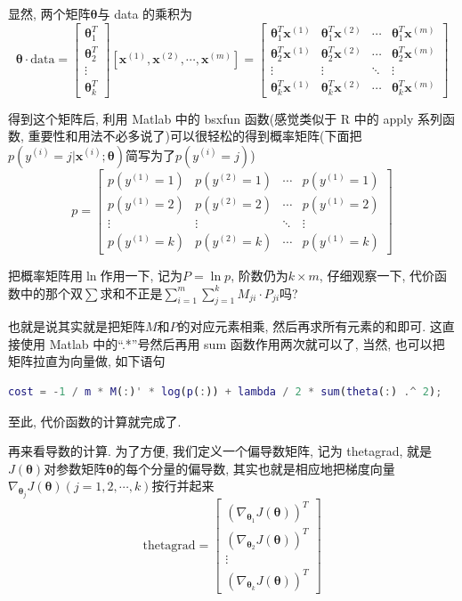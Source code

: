 \documentclass[a4paper,UTF8]{ctexart}
\theoremstyle{plain} \newtheorem{theorem}{定理}[section]
\theoremstyle{plain} \newtheorem{definition}{定义}[section]
\theoremstyle{plain} \newtheorem{lemma}{引理}[section]
\theoremstyle{plain} \newtheorem{proposition}{命题}[section]
\theoremstyle{plain} \newtheorem{example}{例}[section]
\theoremstyle{plain} \newtheorem{remark}{注}[section]
\theoremstyle{plain} \newtheorem{corollary}{推论}[section]
\begin{document}
显然, 两个矩阵$\bm{\theta}$与 data 的乘积为
$$
\bm{\theta} \cdot \mathrm{data} = 
\begin{bmatrix}
\bm{\theta}_{1}^{T} \\ 
\bm{\theta}_{2}^{T} \\ 
\vdots \\ 
\bm{\theta}_{k}^{T}
\end{bmatrix}
[\bm{x}^{(1)}, \bm{x}^{(2)}, \cdots, \bm{x}^{(m)}] = 
\begin{bmatrix}
\bm{\theta}_{1}^{T} \bm{x}^{(1)} & \bm{\theta}_{1}^{T} \bm{x}^{(2)} & \cdots & \bm{\theta}_{1}^{T} \bm{x}^{(m)} \\ 
\bm{\theta}_{2}^{T} \bm{x}^{(1)} & \bm{\theta}_{2}^{T} \bm{x}^{(2)} & \cdots & \bm{\theta}_{2}^{T} \bm{x}^{(m)} \\ 
\vdots & \vdots & \ddots & \vdots \\ 
\bm{\theta}_{k}^{T} \bm{x}^{(1)} & \bm{\theta}_{k}^{T} \bm{x}^{(2)} & \cdots & \bm{\theta}_{k}^{T} \bm{x}^{(m)}
\end{bmatrix}
$$

得到这个矩阵后, 利用 Matlab 中的 bsxfun 函数(感觉类似于 R 中的 apply 系列函数, 重要性和用法不必多说了)可以很轻松的得到概率矩阵(下面把$p(y^{(i)} = j | \bm{x}^{(i)}; \bm{\theta})$简写为了$p(y^{(i)} = j)$)
$$
p = 
\begin{bmatrix}
p(y^{(1)} = 1) & p(y^{(2)} = 1) & \cdots & p(y^{(1)} = 1) \\ 
p(y^{(1)} = 2) & p(y^{(2)} = 2) & \cdots & p(y^{(1)} = 2) \\
\vdots & \vdots & \ddots & \vdots \\ 
p(y^{(1)} = k) & p(y^{(2)} = k) & \cdots & p(y^{(1)} = k)
\end{bmatrix}
$$

把概率矩阵用$\ln$作用一下, 记为$P = \ln p$, 阶数仍为$k \times m$, 仔细观察一下, 代价函数中的那个双$\sum$求和不正是$\sum\limits_{i=1}^{m} \sum\limits_{j=1}^{k} M_{ji} \cdot P_{ji}$吗?

也就是说其实就是把矩阵$M$和$P$的对应元素相乘, 然后再求所有元素的和即可. 这直接使用 Matlab 中的“.*”号然后再用 sum 函数作用两次就可以了, 当然, 也可以把矩阵拉直为向量做, 如下语句
\begin{lstlisting}[language=matlab]
cost = -1 / m * M(:)' * log(p(:)) + lambda / 2 * sum(theta(:) .^ 2);
\end{lstlisting}

至此, 代价函数的计算就完成了.

再来看导数的计算. 为了方便, 我们定义一个偏导数矩阵, 记为 thetagrad, 就是$J(\bm{\theta})$对参数矩阵$\bm{\theta}$的每个分量的偏导数, 其实也就是相应地把梯度向量$\nabla_{\bm{\theta}_{j}} J(\bm{\theta}) (j=1,2,\cdots,k)$按行并起来
$$
\mathrm{thetagrad} = 
\begin{bmatrix}
(\nabla_{\bm{\theta}_{1}} J(\bm{\theta}))^{T} \\ 
(\nabla_{\bm{\theta}_{2}} J(\bm{\theta}))^{T} \\
\vdots \\ 
(\nabla_{\bm{\theta}_{k}} J(\bm{\theta}))^{T} 
\end{bmatrix}
$$
\end{document}
